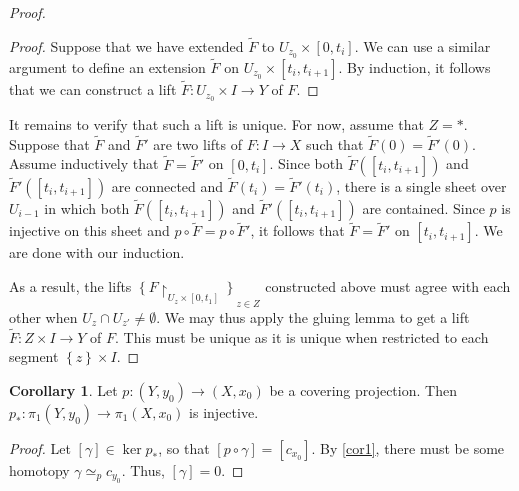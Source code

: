 \documentclass[10pt,letterpaper,cm]{nupset}
\theoremstyle{definition}
\theoremstyle{theorem}
\newtheorem{corollary}[definition]{Corollary}
\theoremstyle{remark}
\newcommand{\1}{\mathbb{1}}
\newcommand{\0}{\vec 0}
\begin{document}
\begin{proof}
\begin{proof}
 Suppose that we have extended $\widetilde{F}$ to $U_{z_0} \times \left[0,t_i\right]$. We can use a similar argument to define an extension $\widetilde{F}$ on $U_{z_0} \times \left[t_i, t_{i+1}\right]$.  By induction, it follows that we can construct a lift $\tilde{F} : U_{z_0} \times I \to Y$ of $F$.
\end{proof}
 It remains to verify that such a lift is unique. For now, assume that $Z= \ast$. Suppose that $\widetilde{F}$ and $\widetilde{F}'$ are two lifts of $F: I \to X$ such that $\widetilde{F}(0) = \widetilde{F}'(0)$. Assume inductively that $\widetilde{F} = \widetilde{F}'$ on $\left[0,t_i\right]$. Since both $\widetilde{F}\left(\left[t_i, t_{i+1}\right]\right)$ and $\widetilde{F}'\left(\left[t_i, t_{i+1}\right]\right)$ are connected and $\widetilde{F}(t_i) = \widetilde{F}'(t_i)$, there is a single sheet over $U_{i-1}$ in which both $\widetilde{F}\left(\left[t_i, t_{i+1}\right]\right)$ and $\widetilde{F}'\left(\left[t_i, t_{i+1}\right]\right)$ are contained. Since $p$ is injective on this sheet and $p\circ \widetilde{F} = p \circ \widetilde{F}'$, it follows that $\widetilde{F} = \widetilde{F}'$ on $\left[t_i, t_{i+1}\right]$. We are done with our induction.


 As a result, the  lifts  $\left\{F \restriction_{U_{z} \times \left[0, t_1\right]}\right\}_{z\in Z}$ constructed above must agree with each other when $U_z \cap U_{z'} \ne \emptyset$. We may thus apply the gluing lemma to get a lift $\tilde{F} : Z \times I \to Y$ of $F$. This must be unique as it is unique when restricted to each segment $\left\{z\right\} \times I$.
\end{proof}

\begin{corollary}
Let $p: \left(Y, y_0\right) \to \left(X, x_0\right)$  be a covering projection. Then $p_{\ast} : \pi_1\left(Y, y_0\right) \to \pi_1\left(X, x_0\right)$ is injective. 
\end{corollary}
\begin{proof}
Let $\left[\gamma\right] \in \ker{p_{\ast}}$, so that $\left[p\circ \gamma\right] = \left[c_{x_0}\right]$. By \cref{cor1}, there must be some homotopy $\gamma \simeq_p c_{y_0}$. Thus, $\left[\gamma\right] = 0$.
\end{proof}
\end{document}
